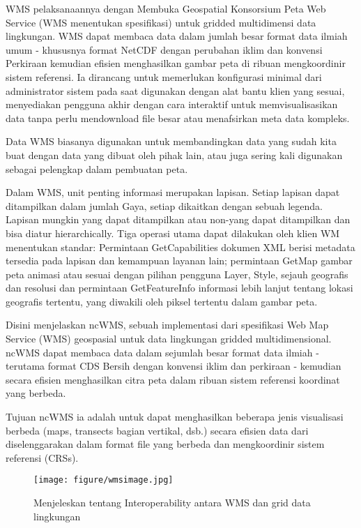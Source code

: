    WMS pelaksanaannya dengan Membuka Geospatial Konsorsium Peta Web Service (WMS menentukan spesifikasi) untuk gridded multidimensi data lingkungan. WMS dapat membaca data dalam jumlah besar format data ilmiah umum - khususnya format NetCDF dengan perubahan iklim dan konvensi Perkiraan kemudian efisien menghasilkan gambar peta di ribuan mengkoordinir sistem referensi. Ia dirancang untuk memerlukan konfigurasi minimal dari administrator sistem pada saat digunakan dengan alat bantu klien yang sesuai, menyediakan pengguna akhir dengan cara interaktif untuk memvisualisasikan data tanpa perlu mendownload file besar atau menafsirkan meta data kompleks. 

Data WMS biasanya digunakan untuk membandingkan data yang sudah kita buat dengan data yang dibuat oleh pihak lain, atau juga sering kali
digunakan sebagai pelengkap dalam pembuatan peta.


Dalam WMS, unit penting informasi merupakan lapisan. Setiap lapisan dapat ditampilkan dalam jumlah Gaya, setiap dikaitkan dengan sebuah
legenda. Lapisan mungkin yang dapat ditampilkan atau non-yang dapat ditampilkan dan bisa diatur hierarchically. Tiga operasi utama dapat
dilakukan oleh klien WM menentukan standar: Permintaan GetCapabilities dokumen XML berisi metadata tersedia pada lapisan dan kemampuan
layanan lain; permintaan GetMap gambar peta animasi atau sesuai dengan pilihan pengguna Layer, Style, sejauh geografis dan resolusi dan
permintaan GetFeatureInfo informasi lebih lanjut tentang lokasi geografis tertentu, yang diwakili oleh piksel tertentu dalam gambar
peta.

Disini menjelaskan ncWMS, sebuah implementasi dari spesifikasi Web Map Service (WMS) geospasial untuk data lingkungan gridded
multidimensional. ncWMS dapat membaca data dalam sejumlah besar format data ilmiah - terutama format CDS Bersih dengan konvensi iklim 
dan perkiraan - kemudian secara efisien menghasilkan citra peta dalam ribuan sistem referensi koordinat yang berbeda.

Tujuan ncWMS ia adalah untuk dapat menghasilkan beberapa jenis visualisasi berbeda (maps, transects bagian vertikal, dsb.) secara
efisien data dari diselenggarakan dalam format file yang berbeda dan mengkoordinir sistem referensi (CRSs).
\begin{figure}[ht]
\centerline{\texttt{[image: figure/wmsimage.jpg]}}
\caption{Menjeleskan tentang Interoperability antara WMS dan grid data lingkungan}	
\label{Web Map Service}
\end{figure}

